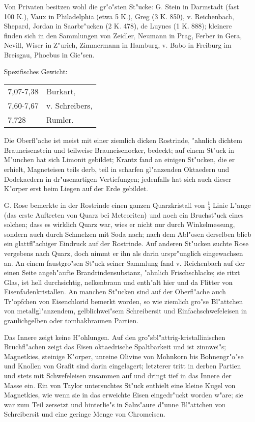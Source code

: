\documentclass[a4paper, 11pt, oneside]{article}
\begin{document}
Von Privaten besitzen wohl die gr"o"sten St"ucke: G. Stein in Darmstadt (fast 100 K.), Vaux in Philadelphia (etwa 5 K.), Greg (3 K. 850), v. Reichenbach, Shepard, Jordan in Saarbr"ucken (2 K. 478), de Luynes (1 K. 888); kleinere finden sich in den Sammlungen von Zeidler, Neumann in Prag, Ferber in Gera, Nevill, Wiser in Z"urich, Zimmermann in Hamburg, v. Babo in Freiburg im Breisgau, Phoebus in Gie"sen.

Spezifisches Gewicht:  
\begin{table}[!ht]
    \centering\swabfamily\Large
    \begin{tabular}{l l}
        7,07-7,38 & Burkart,\\
        7,60-7,67 & v. Schreibers,\\
        7,728 & Rumler.
    \end{tabular}
\end{table}

Die Oberfl"ache ist meist mit einer ziemlich dicken Rostrinde, "ahnlich dichtem Brauneisenstein und teilweise Brauneisenocker, bedeckt; auf einem St"uck in M"unchen hat sich Limonit gebildet; Krantz fand an einigen St"ucken, die er erhielt, Magneteisen teils derb, teil in scharfen gl"anzenden Oktaedern und Dodekaedern in dr"usenartigen Vertiefungen; jedenfalls hat sich auch dieser K"orper erst beim Liegen auf der Erde gebildet.

G. Rose bemerkte in der Rostrinde einen ganzen Quarzkristall von $\mathfrak{\frac{1}{3}}$ Linie L"ange (das erste Auftreten von Quarz bei Meteoriten) und noch ein Bruchst"uck eines solchen; dass es wirklich Quarz war, wies er nicht nur durch Winkelmessung, sondern auch durch Schmelzen mit Soda nach; nach dem Abl"osen derselben blieb ein glattfl"achiger Eindruck auf der Rostrinde. Auf anderen St"ucken suchte Rose vergebens nach Quarz, doch nimmt er ihn als darin urspr"unglich eingewachsen an. An einem faustgro"sen St"uck seiner Sammlung fand v. Reichenbach auf der einen Seite angeh"aufte Brandrindensubstanz, "ahnlich Frischschlacke; sie ritzt Glas, ist hell durchsichtig, nelkenbraun und enth"alt hier und da Flitter von Eisenfadenkristallen. An manchen St"ucken sind auf der Oberfl"ache auch Tr"opfchen von Eisenchlorid bemerkt worden, so wie ziemlich gro"se Bl"attchen von metallgl"anzendem, gelblichwei"sem Schreibersit und Einfachschwefeleisen in graulichgelben oder tombakbraunen Partien.

Das Innere zeigt keine H"ohlungen. Auf den gro"sbl"attrig-kristallinischen Bruchfl"achen zeigt das Eisen oktaedrische Spaltbarkeit und ist zinnwei"s; Magnetkies, steinige K"orper, unreine Olivine von Mohnkorn bis Bohnengr"o"se und Knollen von Grafit sind darin eingelagert; letzterer tritt in derben Partien und stets mit Schwefeleisen zusammen auf und dringt tief in das Innere der Masse ein. Ein von Taylor untersuchtes St"uck enthielt eine kleine Kugel von Magnetkies, wie wenn sie in das erweichte Eisen eingedr"uckt worden w"are; sie war zum Teil zersetzt und hinterlie"s in Salzs"aure d"unne Bl"attchen von Schreibersit und eine geringe Menge von Chromeisen.
\end{document}
